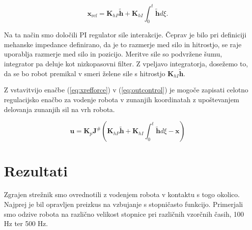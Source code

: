 \documentclass[a4paper]{article}
\begin{document}
\begin{equation} \label{eq:xrefforce}
\textbf{x}_{\mathrm{ref}} = \textbf{K}_{hP}\tilde{\textbf{h}} + \textbf{K}_{hI} \int_{0}^{t}\tilde{\textbf{h}}d\xi.
\end{equation}

Na ta način smo določili PI regulator sile interakcije. Čeprav je bilo pri definiciji mehanske impedance definirano, da je to razmerje med silo in hitrostjo, se raje uporablja razmerje med silo in pozicijo. Meritve sile so podvržene šumu, integrator pa deluje kot nizkopasovni filter. Z vpeljavo integratorja, dosežemo to, da se bo robot premikal v smeri želene sile s hitrostjo $\textbf{K}_{hI} \tilde{\textbf{h}}$.

Z vstavitvijo enačbe (\ref{eq:xrefforce}) v (\ref{eq:outcontrol}) je mogoče zapisati celotno regulacijsko enačbo za vodenje robota v zunanjih koordinatah z upoštevanjem delovanja zunanjih sil na vrh robota.

\begin{equation} \label{eq:admitcontrol}
\textbf{u} = \textbf{K}_p  \textbf{J}^{\#}(\textbf{K}_{hP}\tilde{\textbf{h}} + \textbf{K}_{hI} \int_{0}^{t}\tilde{\textbf{h}}d\xi - \textbf{x})
\end{equation}


\section{Rezultati}

Zgrajen strežnik smo ovrednotili z vodenjem robota v kontaktu s togo okolico. Najprej je bil opravljen preizkus na vzbujanje s stopničasto funkcijo. Primerjali smo odzive robota na različno velikost stopnice pri različnih vzorčnih časih, 100 Hz ter 500 Hz.
\end{document}
